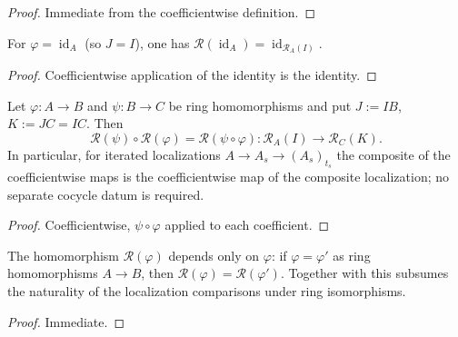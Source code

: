\begin{proof}
  \leanok
  Immediate from the coefficientwise definition.
\end{proof}

\begin{lemma}
  \label{lemma:nagata-rees-localization-one}
  \leanok

  For $\varphi=\operatorname{id}_A$ (so $J=I$), one has
  $\mathcal R(\operatorname{id}_A)=\operatorname{id}_{\mathcal R_A(I)}$.
\end{lemma}

\begin{proof}
  \leanok
  Coefficientwise application of the identity is the identity.
\end{proof}

\begin{lemma}
  \label{lemma:nagata-rees-localization-mul}
  \leanok

  Let $\varphi\colon A\to B$ and $\psi\colon B\to C$ be ring homomorphisms
  and put $J:=IB$, $K:=JC=IC$.  Then
  \[
    \mathcal R(\psi)\circ\mathcal R(\varphi)=\mathcal R(\psi\circ\varphi)
    \colon\mathcal R_A(I)\longrightarrow\mathcal R_C(K).
  \]
  In particular, for iterated localizations
  $A\to A_s\to(A_s)_{t_s}$ the composite of the coefficientwise maps is
  the coefficientwise map of the composite localization; no separate
  cocycle datum is required.
\end{lemma}

\begin{proof}
  \leanok
  Coefficientwise, $\psi\circ\varphi$ applied to each coefficient.
\end{proof}

\begin{lemma}[Congruence]
  \label{lemma:nagata-rees-localization-natural}
  \leanok

  The homomorphism $\mathcal R(\varphi)$ depends only on $\varphi$: if
  $\varphi=\varphi'$ as ring homomorphisms $A\to B$, then
  $\mathcal R(\varphi)=\mathcal R(\varphi')$.  Together with
   this subsumes the naturality
  of the localization comparisons under ring isomorphisms.
\end{lemma}

\begin{proof}
  \leanok
  Immediate.
\end{proof}

